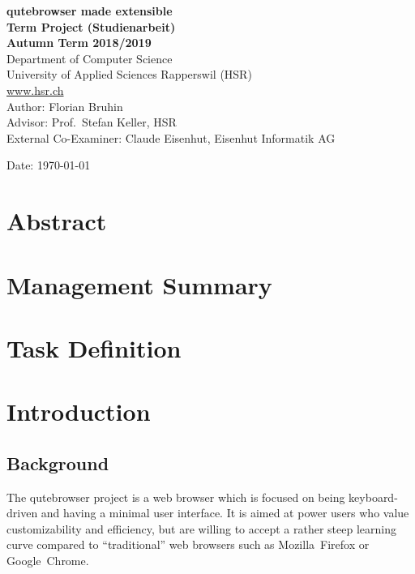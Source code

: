 \documentclass[a4paper,parskip=full]{scrreprt}
\begin{document}
\begin{titlepage}
\begin{flushleft}
{\huge \bfseries qutebrowser made extensible}\\[0.5cm]
{\large \bfseries Term Project (Studienarbeit) \\[0.2cm] Autumn Term 2018/2019}\\[2cm]

Department of Computer Science\\
University of Applied Sciences Rapperswil (HSR)\\
\url{www.hsr.ch}\\[1cm]

Author: Florian Bruhin\\[0.3cm]
Advisor: Prof.~Stefan Keller, HSR\\[0.3cm]
External Co-Examiner: Claude Eisenhut, Eisenhut Informatik AG

\vfill
Date: {\today}

\end{flushleft}

\end{titlepage}



\chapter*{Abstract}

\chapter*{Management Summary}


\tableofcontents

\listoffigures
\listoftables
\listoflistings


\chapter*{Task Definition}

\chapter{Introduction}
\label{ch:intro}

\section{Background}

The qutebrowser project is a web browser which is focused on being
keyboard-driven and having a minimal user interface. It is aimed at power users
who value customizability and efficiency, but are willing to accept a rather
steep learning curve compared to ``traditional'' web browsers such as
Mozilla~Firefox or Google~Chrome.
\end{document}
